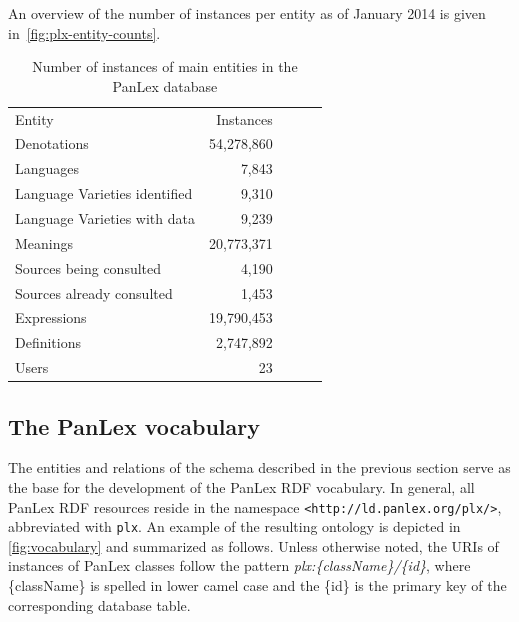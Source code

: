 \documentclass[sw]{iosart2c}
\begin{document}
An overview of the number of instances per entity as of January 2014 is given in~\autoref{fig:plx-entity-counts}.
\begin{table}
  \centering\begin{scriptsize}
  \begin{tabular}{lrclr}
    Entity             & Instances  \\
    \cline{1-2}
    Denotations        & 54,278,860 \\  %
    Languages          &      7,843 \\ %
    Language Varieties identified           &      9,310 \\  %
    Language Varieties with data           &      9,239 \\  %
    Meanings           & 20,773,371 \\  %
    Sources being consulted         &      4,190 \\  %
    Sources already consulted         &      1,453 \\  %
    Expressions        & 19,790,453 \\ %
    Definitions        &  2,747,892 \\ %
    Users              &          23 \\ %
  \end{tabular}
  \end{scriptsize}
  \caption{Number of instances of main entities in the PanLex database}
  \label{fig:plx-entity-counts}
\end{table}

\subsection{The PanLex vocabulary}
\label{sec:vocabulary}
The entities and relations of the schema described in the previous section serve as the base for the development of the PanLex RDF vocabulary.
In general, all PanLex RDF resources reside in the namespace \texttt{\small <http://ld.panlex.org/plx/>}, abbreviated with \texttt{\small plx}.
An example of the resulting ontology is depicted in \autoref{fig:vocabulary} and summarized as follows.
Unless otherwise noted, the URIs of instances of PanLex classes follow the pattern \emph{plx:\{className\}/\{id\}}, where \{className\} is spelled in lower camel case and the \{id\} is the primary key of the corresponding database table.
\end{document}
